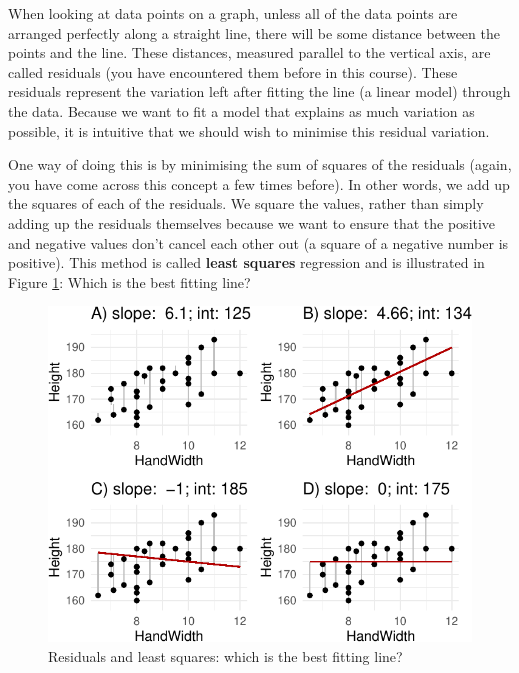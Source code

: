 \documentclass[
  a4paperpaper,
]{book}
\begin{document}
When looking at data points on a graph, unless all of the data points are arranged perfectly along a straight line, there will be some distance between the points and the line. These distances, measured parallel to the vertical axis, are called residuals (you have encountered them before in this course). These residuals represent the variation left after fitting the line (a linear model) through the data. Because we want to fit a model that explains as much variation as possible, it is intuitive that we should wish to minimise this residual variation.

One way of doing this is by minimising the sum of squares of the residuals (again, you have come across this concept a few times before). In other words, we add up the squares of each of the residuals. We square the values, rather than simply adding up the residuals themselves because we want to ensure that the positive and negative values don't cancel each other out (a square of a negative number is positive). This method is called \textbf{least squares} regression and is illustrated in Figure \ref{fig:leastSquares}: Which is the best fitting line?

\begin{figure}[ht]

{\centering \includegraphics{BB852_files/figure-latex/leastSquares-1} 

}

\caption{Residuals and least squares: which is the best fitting line?}\label{fig:leastSquares}
\end{figure}
\end{document}
